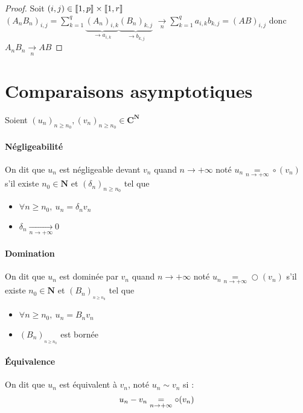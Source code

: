 		\begin{proof}
			Soit $(i,j)\in{\llbracket 1,p \rrbracket}\times{\llbracket 1,r \rrbracket}$ \\ 
			$\left(A_nB_n\right) _{i,j} = \sum_{k=1}^{q} \underbrace{\left(A_n\right)_{i,k}}_{\rightarrow a_{i,k}}
			\underbrace{\left(B_n\right)_{k,j}}_{\rightarrow b_{k,j}}$ $\underset{n}{\rightarrow} \sum_{k=1}^{q} a_{i,k}b_{k,j} = (AB)_{i,j}$ donc 
			$A_nB_n \underset{n}{\rightarrow} AB$
		\end{proof}


\section{Comparaisons asymptotiques}
	
		Soient $\left(u_n\right)_{n\geq n_0} ,\left(v_n\right)_{n\geq n_0} \in \mathbf{C}^{\mathbf{N}}$ 
		
		\vspace{-10pt}
		\traitd
		\paragraph{Négligeabilité}
			On dit que $u_n$ est négligeable devant $v_n$ quand $n\rightarrow +\infty$ noté $u_n \underset{n\rightarrow +\infty}{=} \circ (v_n)$ s'il existe $n_0 \in \mathbf{N}$ et $\left(\delta_n\right)_{n\geq n_0}$ tel que
			\begin{itemize}
				\item $\forall n\geq n_0 ,~u_n = \delta_nv_n$
				\item $\delta_n \underset{n\rightarrow +\infty}{\longrightarrow} 0$
			\end{itemize}
		\traitdouble
		\paragraph{Domination}
			On dit que $u_n$ est dominée par $v_n$ quand $n\rightarrow +\infty$ noté $u_n \underset{n\rightarrow +\infty}{=} \bigcirc (v_n)$ s'il existe $n_0 \in \mathbf{N}$ et $\left(B_n\right)_{_{n\geq n_0}}$ tel que
			\begin{itemize}
				\item $\forall n\geq n_0 ,~u_n = B_nv_n$ 
				\item $\left( B_n \right)_{_{n\geq n_0}}$ est bornée
			\end{itemize}
		\traitdouble
		\paragraph{Équivalence}
			On dit que $u_n$ est équivalent à $v_n$, noté $u_n \sim v_n$ 
			si : 
			\[
				u_n - v_n \underset{n\rightarrow +\infty}{=} \circ (v_n) 
			\vspace*{-20pt}
			\]
		\trait

